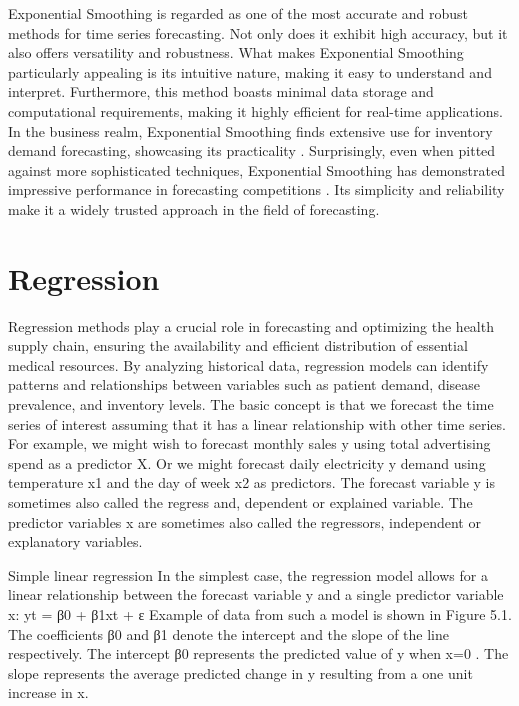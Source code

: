 \documentclass[
  authoryear,
  preprint,
  3p]{elsarticle}
\begin{document}
Exponential Smoothing is regarded as one of the most accurate and robust
methods for time series forecasting. Not only does it exhibit high
accuracy, but it also offers versatility and robustness. What makes
Exponential Smoothing particularly appealing is its intuitive nature,
making it easy to understand and interpret. Furthermore, this method
boasts minimal data storage and computational requirements, making it
highly efficient for real-time applications. In the business realm,
Exponential Smoothing finds extensive use for inventory demand
forecasting, showcasing its practicality \citep{gardner1985exponential}.
Surprisingly, even when pitted against more sophisticated techniques,
Exponential Smoothing has demonstrated impressive performance in
forecasting competitions
\citep[\citet{makridakis1982accuracy}]{makridakis2000m3}. Its simplicity
and reliability make it a widely trusted approach in the field of
forecasting.

\hypertarget{regression}{%
\section{Regression}\label{regression}}

Regression methods play a crucial role in forecasting and optimizing the
health supply chain, ensuring the availability and efficient
distribution of essential medical resources. By analyzing historical
data, regression models can identify patterns and relationships between
variables such as patient demand, disease prevalence, and inventory
levels. The basic concept is that we forecast the time series of
interest assuming that it has a linear relationship with other time
series. For example, we might wish to forecast monthly sales y using
total advertising spend as a predictor X. Or we might forecast daily
electricity y demand using temperature x1 and the day of week x2 as
predictors. The forecast variable y is sometimes also called the regress
and, dependent or explained variable. The predictor variables x are
sometimes also called the regressors, independent or explanatory
variables.

Simple linear regression In the simplest case, the regression model
allows for a linear relationship between the forecast variable y and a
single predictor variable x: yt = β0 + β1xt + ε Example of data from
such a model is shown in Figure 5.1. The coefficients β0 and β1 denote
the intercept and the slope of the line respectively. The intercept β0
represents the predicted value of y when x=0 . The slope represents the
average predicted change in y resulting from a one unit increase in x.
\end{document}

